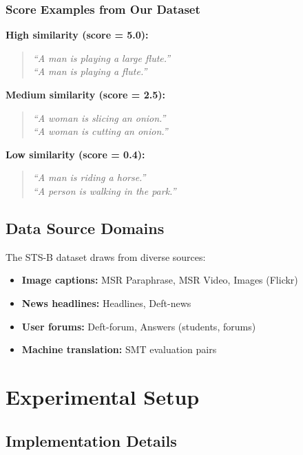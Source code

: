 \documentclass[11pt,a4paper]{article}
\begin{document}
\subsubsection{Score Examples from Our Dataset}

\textbf{High similarity (score = 5.0):}
\begin{quote}
\textit{``A man is playing a large flute.''}\\
\textit{``A man is playing a flute.''}
\end{quote}

\textbf{Medium similarity (score = 2.5):}
\begin{quote}
\textit{``A woman is slicing an onion.''}\\
\textit{``A woman is cutting an onion.''}
\end{quote}

\textbf{Low similarity (score = 0.4):}
\begin{quote}
\textit{``A man is riding a horse.''}\\
\textit{``A person is walking in the park.''}
\end{quote}

\subsection{Data Source Domains}

The STS-B dataset draws from diverse sources:
\begin{itemize}
    \item \textbf{Image captions:} MSR Paraphrase, MSR Video, Images (Flickr)
    \item \textbf{News headlines:} Headlines, Deft-news
    \item \textbf{User forums:} Deft-forum, Answers (students, forums)
    \item \textbf{Machine translation:} SMT evaluation pairs
\end{itemize}

\section{Experimental Setup}

\subsection{Implementation Details}
\end{document}
